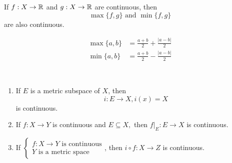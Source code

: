 \begin{example}
    If $f: X \to \mathbb{R}$ and $g: X \to \mathbb{R}$ are continuous, then
    $$\text{$\max\{f,g\}$ and $\min\{f,g\}$}$$
    are also continuous.
\end{example}
\begin{align*}
    \max\{a,b\} &= \frac{a+b}{2} + \frac{|a-b|}{2} \\
    \min\{a,b\} &= \frac{a+b}{2} - \frac{|a-b|}{2}
\end{align*}

\begin{example}\leavevmode \\
    \begin{enumerate}[$(1)$]
        \item If $E$ is a metric subspace of $X$, then $$i: E \to X, i(x) = X$$ is continuous.
        \item If $f:X \to Y$ is continuous and $E\subseteq X,$ then $f|_{E}: E \to X$ is continuous.
        \item If $\begin{cases*}
            f: X \to Y \text{ is continuous} \\
            Y \text{ is a metric space}
        \end{cases*}$, then $i \circ f: X \to Z$ is continuous.
    \end{enumerate}
\end{example}